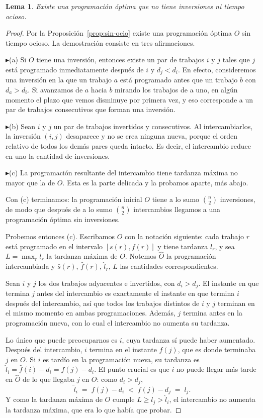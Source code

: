 \documentclass[12pt, spanish, oneside, openany]{book}
\newcommand{\comparo}[1]{\medskip\noindent
  \textcolor{navy!70}{$\blacktriangleright$}\enspace#1\enspace}
\theoremstyle{uprightplain}
\newtheorem{lema}[teorema]{Lema}
\theoremstyle{definition}
\theoremstyle{remark}
\theoremstyle{definition}
\begin{document}
\begin{lema}
\label{lema:optima-sin-inversiones}
Existe una programación óptima que no tiene inversiones ni tiempo ocioso.
\end{lema}
\begin{proof}
Por la Proposición~\ref{prop:sin-ocio} existe una programación óptima $O$ sin tiempo ocioso. La demostración consiste en tres afirmaciones.

\comparo{(a)} Si $O$ tiene una inversión, entonces existe un par de trabajos $i$ y $j$ tales que $j$ está programado inmediatamente después de $i$ y $d_j<d_i$. En efecto, consideremos una inversión en la que un trabajo $a$ está programado antes que un trabajo $b$ con $d_a>d_b$. Si avanzamos de $a$ hacia $b$ mirando los trabajos de a uno, en algún momento el plazo que vemos disminuye por primera vez, y eso corresponde a un par de trabajos consecutivos que forman una inversión.

\comparo{(b)} Sean $i$ y $j$ un par de trabajos invertidos y consecutivos. Al intercambiarlos, la inversión $(i,j)$ desaparece y no se crea ninguna nueva, porque el orden relativo de todos los demás pares queda intacto. Es decir, el intercambio reduce en uno la cantidad de inversiones.

\comparo{(c)} La programación resultante del intercambio tiene tardanza máxima no mayor que la de $O$. Esta es la parte delicada y la probamos aparte, más abajo.

Con (c) terminamos: la programación inicial $O$ tiene a lo sumo $\binom{n}{2}$ inversiones, de modo que después de a lo sumo $\binom{n}{2}$ intercambios llegamos a una programación óptima sin inversiones.

Probemos entonces (c). Escribamos $O$ con la notación siguiente: cada trabajo $r$ está programado en el intervalo $[s(r),f(r)]$ y tiene tardanza $l_r$, y sea $L=\max_r l_r$ la tardanza máxima de $O$. Notemos $\widehat{O}$ la programación intercambiada y $\widehat{s}(r)$, $\widehat{f}(r)$, $\widehat{l}_r$, $\widehat{L}$ las cantidades correspondientes.

Sean $i$ y $j$ los dos trabajos adyacentes e invertidos, con $d_i>d_j$. El instante en que termina $j$ antes del intercambio es exactamente el instante en que termina $i$ después del intercambio, así que todos los trabajos distintos de $i$ y $j$ terminan en el mismo momento en ambas programaciones. Además, $j$ termina antes en la programación nueva, con lo cual el intercambio no aumenta su tardanza.

Lo único que puede preocuparnos es $i$, cuya tardanza sí puede haber aumentado. Después del intercambio, $i$ termina en el instante $f(j)$, que es donde terminaba $j$ en $O$. Si $i$ es tardío en la programación nueva, su tardanza es $\widehat{l}_i=\widehat{f}(i)-d_i=f(j)-d_i$. El punto crucial es que $i$ no puede llegar más tarde en $\widehat{O}$ de lo que llegaba $j$ en $O$: como $d_i>d_j$,
\[
\widehat{l}_i \;=\; f(j)-d_i \;<\; f(j)-d_j \;=\; l_j .
\]
Y como la tardanza máxima de $O$ cumple $L \ge l_j > \widehat{l}_i$, el intercambio no aumenta la tardanza máxima, que era lo que había que probar.
\end{proof}
\end{document}
